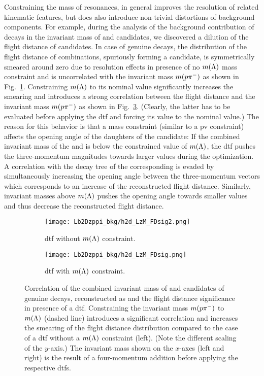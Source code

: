 Constraining the mass of resonances, in general improves the resolution of related kinematic features, but does also introduce non-trivial distortions of background components.
For example, during the analysis of the background contribution of \decay{\Lb}{\Dz\proton\pim} decays in the invariant mass of \Dz and \Lz candidates, we discovered a dilution of the flight distance of \Lz candidates.
In case of genuine \decay{\Lb}{\Dz\proton\pim} decays, the distribution of the flight distance of \proton\pim combinations, spuriously forming a \Lz candidate, is symmetrically smeared around zero due to resolution effects in presence of no $m({\Lambda})$ mass constraint and is uncorrelated with the invariant mass $m({p}{{\pi}^-})$ as shown in Fig.~\ref{fig:LbToDzppi_LzM_FDsig2}.
Constraining $m({\Lambda})$ to its nominal value significantly increases the smearing and introduces a strong correlation between the flight distance and the invariant mass $m({p}{{\pi}^-})$ as shown in Fig.~\ref{fig:LbToDzppi_LzM_FDsig}. (Clearly, the latter has to be evaluated before applying the \gls{dtf} and forcing its value to the nominal value.)
The reason for this behavior is that a mass constraint (similar to a \gls{pv} constraint) affects the opening angle of the daughters of the \Lz candidate:
If the combined invariant mass of the \proton and \pim is below the constrained value of $m({\Lambda})$, the \gls{dtf} pushes the three-momentum magnitudes towards larger values during the optimization.
A correlation with the decay tree of the corresponding \Dz is evaded by simultaneously increasing the opening angle between the three-momentum vectors which corresponds to an increase of the reconstructed flight distance.
Similarly, invariant masses above $m({\Lambda})$ pushes the opening angle towards smaller values and thus decrease the reconstructed flight distance.
\begin{figure}[htbp]
    \centering
    \begin{subfigure}{.49\textwidth}
        \texttt{[image: Lb2Dzppi\_bkg/h2d\_LzM\_FDsig2.png]}
        \caption{\Gls{dtf} without $m({\Lambda})$ constraint.}
        \label{fig:LbToDzppi_LzM_FDsig2}
    \end{subfigure}
    \begin{subfigure}{.49\textwidth}
        \texttt{[image: Lb2Dzppi\_bkg/h2d\_LzM\_FDsig.png]}
        \caption{\Gls{dtf} with $m({\Lambda})$ constraint.}
        \label{fig:LbToDzppi_LzM_FDsig}
    \end{subfigure}
    \caption{Correlation of the combined invariant mass of \proton and \pim candidates of genuine \decay{\Lb}{\Dz\proton\pim} decays, reconstructed as \decay{\Lb}{\Dz\Lz} and the flight distance significance in presence of a \gls{dtf}. Constraining the invariant mass $m({p}{{\pi}^-})$ to $m({\Lambda})$ (dashed line) introduces a significant correlation and increases the smearing of the flight distance distribution compared to the case of a \gls{dtf} without a $m({\Lambda})$ constraint (left). (Note the different scaling of the $y$-axis.) The invariant mass shown on the $x$-axes (left and right) is the result of a four-momentum addition before applying the respective \glspl{dtf}.}
\end{figure}

